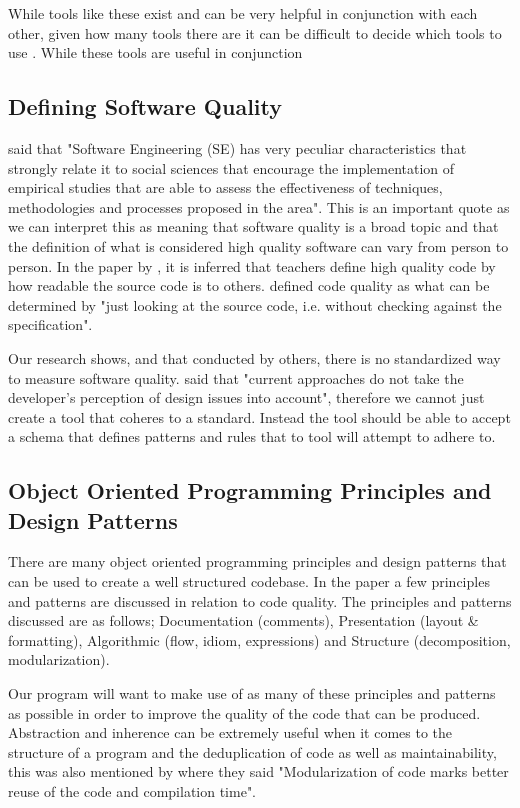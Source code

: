\documentclass{article} %
\begin{document}
While tools like these exist and can be very helpful in conjunction with each other, given how many tools there are it can be difficult to decide which tools to use \citep{}.
While these tools are useful in conjunction 

\subsection{Defining Software Quality}
\cite{6606742} said that "Software Engineering (SE) has very peculiar characteristics that strongly relate it to social sciences that encourage the implementation of empirical studies that are able to assess the effectiveness of techniques, methodologies and processes proposed in the area". This is an important quote as we can interpret this as meaning that software quality is a broad topic and that the definition of what is considered high quality software can vary from person to person. In the paper by \cite{10.1145/3428029.3428047}, it is inferred that teachers define high quality code by how readable the source code is to others. \cite{10.1145/3428029.3428047, 10.1145/2674683.2674702} defined code quality as what can be determined by "just looking at the source code, i.e. without checking against the specification".

Our research shows, and that conducted by others, there is no standardized way to measure software quality. \cite{10.1145/3428029.3428047, 10.1145/2674683.2674702} said that "current approaches do not take the developer's perception of design issues into account", therefore we cannot just create a tool that coheres to a standard. Instead the tool should be able to accept a schema that defines patterns and rules that to tool will attempt to adhere to.

\subsection{Object Oriented Programming Principles and Design Patterns}

There are many object oriented programming principles and design patterns that can be used to create a well structured codebase. In the paper \cite{10.1145/3428029.3428047} a few principles and patterns are discussed in relation to code quality. The principles and patterns discussed are as follows; Documentation (comments), Presentation (layout \& formatting), Algorithmic (flow, idiom, expressions) and Structure (decomposition, modularization).

Our program will want to make use of as many of these principles and patterns as possible in order to improve the quality of the code that can be produced. Abstraction and inherence can be extremely useful when it comes to the structure of a program and the deduplication of code as well as maintainability, this was also mentioned by \cite{8681007} where they said "Modularization of code marks better reuse of the code and compilation time".
\end{document}
